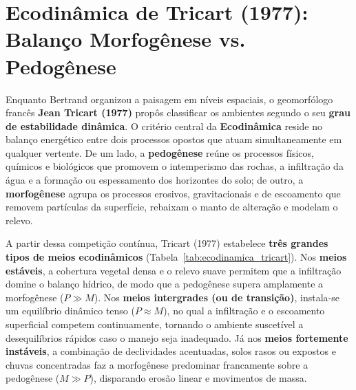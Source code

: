\section{Ecodinâmica de Tricart (1977): Balanço Morfogênese vs. Pedogênese}

Enquanto Bertrand organizou a paisagem em níveis espaciais, o geomorfólogo francês \textbf{Jean Tricart (1977)} propôs classificar os ambientes segundo o seu \textbf{grau de estabilidade dinâmica}. O critério central da \textbf{Ecodinâmica} reside no balanço energético entre dois processos opostos que atuam simultaneamente em qualquer vertente. De um lado, a \textbf{pedogênese} reúne os processos físicos, químicos e biológicos que promovem o intemperismo das rochas, a infiltração da água e a formação ou espessamento dos horizontes do solo; de outro, a \textbf{morfogênese} agrupa os processos erosivos, gravitacionais e de escoamento que removem partículas da superfície, rebaixam o manto de alteração e modelam o relevo.

A partir dessa competição contínua, Tricart (1977) estabelece \textbf{três grandes tipos de meios ecodinâmicos} (Tabela~\ref{tab:ecodinamica_tricart}). Nos \textbf{meios estáveis}, a cobertura vegetal densa e o relevo suave permitem que a infiltração domine o balanço hídrico, de modo que a pedogênese supera amplamente a morfogênese ($P \gg M$). Nos \textbf{meios intergrades (ou de transição)}, instala-se um equilíbrio dinâmico tenso ($P \approx M$), no qual a infiltração e o escoamento superficial competem continuamente, tornando o ambiente suscetível a desequilíbrios rápidos caso o manejo seja inadequado. Já nos \textbf{meios fortemente instáveis}, a combinação de declividades acentuadas, solos rasos ou expostos e chuvas concentradas faz a morfogênese predominar francamente sobre a pedogênese ($M \gg P$), disparando erosão linear e movimentos de massa.

